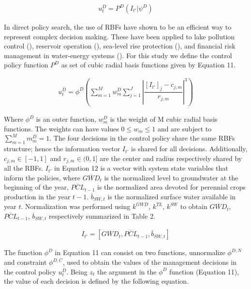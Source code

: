 \documentclass[a4paper,fleqn]{cas-sc}
\begin{document}
\begin{align}
u_{t}^D = P^{D}(I_{t'}|\psi^{D})
\end{align}

In direct policy search, the use of RBFs have shown to be an efficient way to represent complex decision making. These have been applied to lake pollution control (\cite{quinn_direct_2017}), reservoir operation (\cite{giuliani_universal_2014, zatarain_salazar_balancing_2017}), sea-level rise protection (\cite{garner_using_2018}), and financial risk management in water-energy systems (\cite{gupta_can_2020,hamilton_stream_2022}). For this study we define the control policy function $P^D$ as set of cubic radial basis functions given by Equation 11.

\begin{align}
u_{t}^D = \phi^{D}\left(\sum_{m=1}^M w_{m}^D \sum_{j=1}^J \left\lvert\dfrac{[I_{t'}]_{j}-c_{j,m}}{r_{j,m}}\right\rvert^{3}\right)
\end{align}

Where $\phi^{D}$ is an outer function, $w_{m}^D$ is the weight of M cubic radial basis functions. The weights can have values $ 0 \leq w_{m} \leq 1$ and are subject to $\sum_{m=1}^M m_{m}^D= 1$. The four decisions in the control policy share the same RBFs structure; hence the information vector $I_{t'}$ is shared for all decisions. Additionally, $c_{j,m} \in [-1,1]$ and $r_{j,m} \in (0,1]$ are the center and radius respectively shared by all the RBFs. $I_{t'}$ in Equation 12 is a vector with system state variables that inform the policies, where $\overline{GWD}_{t}$ is the normalized level to groundwater at the beginning of the year, $\overline{PCL}_{t-1}$ is the normalized area devoted for perennial crops production in the year $t-1$. $\overline{b}_{SW,t}$ is the normalized surface water available in year $t$. Normalization was performed using $k^{GWD}$, $k^{TL}$, $k^{SW}$ to obtain $\overline{GWD}_{t}$, $\overline{PCL}_{t-1}$, $\overline{b}_{SW,t}$ respectively summarized in Table 2.

\begin{align}
I_{t'} = [\overline{GWD}_{t},\overline{PCL}_{t-1},\overline{b}_{SW,t}]
\end{align}

The function $\phi^{D}$ in Equation 11 can consist on two functions, unnormalize $\phi^{D,N}$ and constraint $\phi^{D,C}$, used to obtain the values of the management decisions in the control policy $u_{t}^D$. Being $z_{t}$ the argument in the $\phi^{D}$ function (Equation 11), the value of each decision is defined by the following equation.
\end{document}
